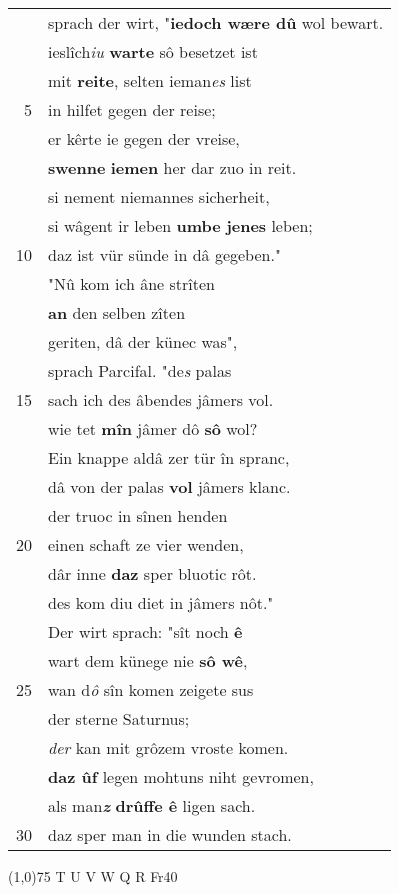 \documentclass[8pt,a4paper,notitlepage]{article}
\begin{document}
\begin{table}[ht]
\begin{minipage}[t]{0.5\linewidth}
\begin{tabular}{rl}
 & sprach der wirt, "\textbf{iedoch wære dû} wol bewart.\\ 
 & ieslîch\textit{iu} \textbf{warte} sô besetzet ist\\ 
 & mit \textbf{reite}, selten ieman\textit{es} list\\ 
5 & in hilfet gegen der reise;\\ 
 & er kêrte ie gegen der vreise,\\ 
 & \textbf{swenne} \textbf{iemen} her dar zuo in reit.\\ 
 & si nement niemannes sicherheit,\\ 
 & si wâgent ir leben \textbf{umbe} \textbf{jenes} leben;\\ 
10 & daz ist vür sünde in dâ gegeben."\\ 
 & "Nû kom ich âne strîten\\ 
 & \textbf{an} den selben zîten\\ 
 & geriten, dâ der künec was",\\ 
 & sprach Parcifal. "de\textit{s} palas\\ 
15 & sach ich des âbendes jâmers vol.\\ 
 & wie tet \textbf{mîn} jâmer dô \textbf{sô} wol?\\ 
 & Ein knappe aldâ zer tür în spranc,\\ 
 & dâ von der palas \textbf{vol} jâmers klanc.\\ 
 & der truoc in sînen henden\\ 
20 & einen schaft ze vier wenden,\\ 
 & dâr inne \textbf{daz} sper bluotic rôt.\\ 
 & des kom diu diet in jâmers nôt."\\ 
 & Der wirt sprach: "sît noch \textbf{ê}\\ 
 & wart dem künege nie \textbf{sô wê},\\ 
25 & wan d\textit{ô} sîn komen zeigete sus\\ 
 & der sterne Saturnus;\\ 
 & \textit{der} kan mit grôzem vroste komen.\\ 
 & \textbf{daz ûf} legen mohtuns niht gevromen,\\ 
 & als man\textit{\textbf{z}} \textbf{drûffe ê} ligen sach.\\ 
30 & daz sper man in die wunden stach.\\ 
\end{tabular}
\scriptsize
\line(1,0){75} \newline
T U V W Q R Fr40 \newline

\end{minipage}
\end{table}
\end{document}
